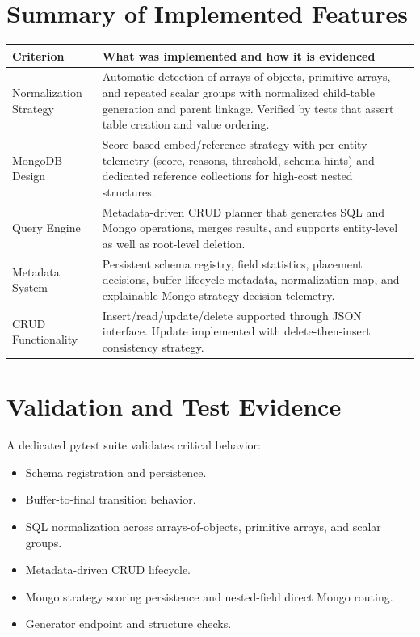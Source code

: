 \documentclass[12pt,a4paper]{article}
\begin{document}
\section{Summary of Implemented Features}
\begin{longtable}{>{\raggedright\arraybackslash}p{} >{\raggedright\arraybackslash}p{}}
\toprule
\textbf{Criterion} & \textbf{What was implemented and how it is evidenced} \\
\midrule
Normalization Strategy & Automatic detection of arrays-of-objects, primitive arrays, and repeated scalar groups with normalized child-table generation and parent linkage. Verified by tests that assert table creation and value ordering. \\
\addlinespace
MongoDB Design & Score-based embed/reference strategy with per-entity telemetry (score, reasons, threshold, schema hints) and dedicated reference collections for high-cost nested structures. \\
\addlinespace
Query Engine & Metadata-driven CRUD planner that generates SQL and Mongo operations, merges results, and supports entity-level as well as root-level deletion. \\
\addlinespace
Metadata System & Persistent schema registry, field statistics, placement decisions, buffer lifecycle metadata, normalization map, and explainable Mongo strategy decision telemetry. \\
\addlinespace
CRUD Functionality & Insert/read/update/delete supported through JSON interface. Update implemented with delete-then-insert consistency strategy. \\
\bottomrule
\end{longtable}

\section{Validation and Test Evidence}
A dedicated pytest suite validates critical behavior:
\begin{itemize}[leftmargin=*]
  \item Schema registration and persistence.
  \item Buffer-to-final transition behavior.
  \item SQL normalization across arrays-of-objects, primitive arrays, and scalar groups.
  \item Metadata-driven CRUD lifecycle.
  \item Mongo strategy scoring persistence and nested-field direct Mongo routing.
  \item Generator endpoint and structure checks.
\end{itemize}
\end{document}
